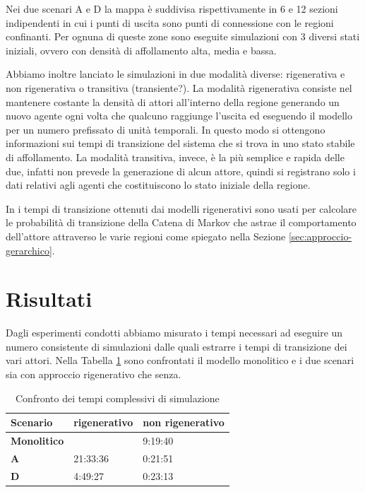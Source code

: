 Nei due scenari A e D la mappa è suddivisa rispettivamente in 6 e 12 sezioni indipendenti in cui i punti di uscita sono punti di connessione con le regioni confinanti. Per ognuna di queste zone sono eseguite simulazioni con 3 diversi stati iniziali, ovvero con densità di affollamento alta, media e bassa. 

Abbiamo inoltre lanciato le simulazioni in due modalità diverse: rigenerativa e non rigenerativa o transitiva (transiente?). La modalità rigenerativa consiste nel mantenere costante la densità di attori all'interno della regione generando un nuovo agente ogni volta che qualcuno raggiunge l'uscita ed eseguendo il modello per un numero prefissato di unità temporali. In questo modo si ottengono informazioni sui tempi di transizione del sistema che si trova in uno stato stabile di affollamento. La modalità transitiva, invece, è la più semplice e rapida delle due, infatti non prevede la generazione di alcun attore, quindi si registrano solo i dati relativi agli agenti che costituiscono lo stato iniziale della regione.

In \cite{esperimenti-sandro} i tempi di transizione ottenuti dai modelli rigenerativi sono usati per calcolare le probabilità di transizione della Catena di Markov che astrae il comportamento dell'attore attraverso le varie regioni come spiegato nella Sezione \ref{sec:approccio-gerarchico}.



\section{Risultati}

Dagli esperimenti condotti abbiamo misurato i tempi necessari ad eseguire un numero consistente di simulazioni dalle quali estrarre i tempi di transizione dei vari attori. Nella Tabella \ref{tab:tabella-confronto} sono confrontati il modello monolitico e i due scenari sia con approccio rigenerativo che senza. 

\begin{table}[h]
  \centering
  \resizebox{0.7\textwidth}{!} {
  \begin{tabular}{ |l|l|l| }
	\hline
	\textbf{Scenario}	&		\textbf{rigenerativo}	&		\textbf{non rigenerativo}	\\ \hline
	\textbf{Monolitico} &		 						&		9:19:40		\\ \hline
	\textbf{A}			 &		21:33:36 				&		0:21:51		\\ \hline
	\textbf{D}			 &		4:49:27 				&		0:23:13		\\ \hline

  \end{tabular}
  }
  \caption{Confronto dei tempi complessivi di simulazione}
  \label{tab:tabella-confronto}
\end{table}

